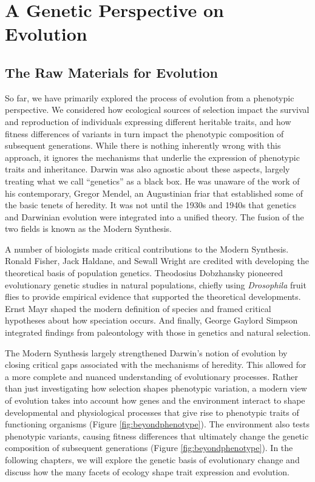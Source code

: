 \documentclass[
]{book}
\begin{document}
\hypertarget{part-a-genetic-perspective-on-evolution}{%
\part{A Genetic Perspective on Evolution}\label{part-a-genetic-perspective-on-evolution}}

\hypertarget{the-raw-materials-for-evolution}{%
\chapter{The Raw Materials for Evolution}\label{the-raw-materials-for-evolution}}

So far, we have primarily explored the process of evolution from a phenotypic perspective. We considered how ecological sources of selection impact the survival and reproduction of individuals expressing different heritable traits, and how fitness differences of variants in turn impact the phenotypic composition of subsequent generations. While there is nothing inherently wrong with this approach, it ignores the mechanisms that underlie the expression of phenotypic traits and inheritance. Darwin was also agnostic about these aspects, largely treating what we call ``genetics'' as a black box. He was unaware of the work of his contemporary, Gregor Mendel, an Augustinian friar that established some of the basic tenets of heredity. It was not until the 1930s and 1940s that genetics and Darwinian evolution were integrated into a unified theory. The fusion of the two fields is known as the Modern Synthesis.

A number of biologists made critical contributions to the Modern Synthesis. Ronald Fisher, Jack Haldane, and Sewall Wright are credited with developing the theoretical basis of population genetics. Theodosius Dobzhansky pioneered evolutionary genetic studies in natural populations, chiefly using \emph{Drosophila} fruit flies to provide empirical evidence that supported the theoretical developments. Ernst Mayr shaped the modern definition of species and framed critical hypotheses about how speciation occurs. And finally, George Gaylord Simpson integrated findings from paleontology with those in genetics and natural selection.

The Modern Synthesis largely strengthened Darwin's notion of evolution by closing critical gaps associated with the mechanisms of heredity. This allowed for a more complete and nuanced understanding of evolutionary processes. Rather than just investigating how selection shapes phenotypic variation, a modern view of evolution takes into account how genes and the environment interact to shape developmental and physiological processes that give rise to phenotypic traits of functioning organisms (Figure \ref{fig:beyondphenotype}). The environment also tests phenotypic variants, causing fitness differences that ultimately change the genetic composition of subsequent generations (Figure \ref{fig:beyondphenotype}). In the following chapters, we will explore the genetic basis of evolutionary change and discuss how the many facets of ecology shape trait expression and evolution.
\end{document}
